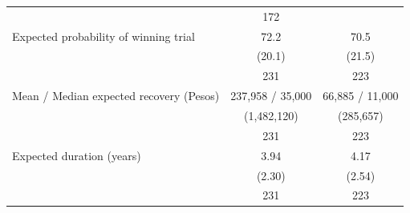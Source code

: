 \begin{tabular}{rrcccc}
\multicolumn{2}{r}{} & \multicolumn{2}{c}{172} & \multicolumn{2}{c}{} \\
\multicolumn{2}{l}{Expected probability of winning trial} & \multicolumn{2}{c}{72.2} & \multicolumn{2}{c}{70.5} \\
\multicolumn{2}{r}{} & \multicolumn{2}{c}{(20.1)} & \multicolumn{2}{c}{(21.5)} \\
\multicolumn{2}{r}{} & \multicolumn{2}{c}{231} & \multicolumn{2}{c}{223} \\
\multicolumn{2}{l}{Mean / Median expected recovery (Pesos)} & \multicolumn{2}{c}{237,958 / 35,000} & \multicolumn{2}{c}{66,885 / 11,000} \\
\multicolumn{2}{r}{} & \multicolumn{2}{c}{(1,482,120)} & \multicolumn{2}{c}{(285,657)} \\
\multicolumn{2}{r}{} & \multicolumn{2}{c}{231} & \multicolumn{2}{c}{223} \\
\multicolumn{2}{l}{Expected duration (years)} & \multicolumn{2}{c}{3.94} & \multicolumn{2}{c}{4.17} \\
\multicolumn{2}{r}{} & \multicolumn{2}{c}{(2.30)} & \multicolumn{2}{c}{(2.54)} \\
\multicolumn{2}{r}{} & \multicolumn{2}{c}{231} & \multicolumn{2}{c}{223} \\
\bottomrule
\bottomrule
\end{tabular}%
